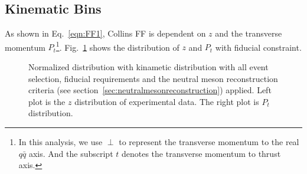\subsection{Kinematic Bins}
\label{sec:kinematicbins}
As shown in Eq.~\eqref{eqn:FF1}, Collins FF is dependent on $z$ and the transverse momentum $P_t$\footnote{In this analysis, we use $\perp$ to represent the transverse momentum to the real $q\bar{q}$ axis. And the subscript $t$ denotes the transverse momentum to thrust axis.}. Fig.~\ref{fig:zptdistri} shows the distribution of $z$ and $P_t$ with fiducial constraint.
\begin{figure}[H]
  \centering     
  \caption{Normalized distribution with kinametic distribution with all event selection, fiducial requirements and the neutral meson reconstruction criteria (see section~\ref{sec:neutralmesonreconstruction}) applied. Left plot is the $z$ distribution of experimental data. The right plot is $P_t$ distribution.}
  \label{fig:zptdistri}
\end{figure}

